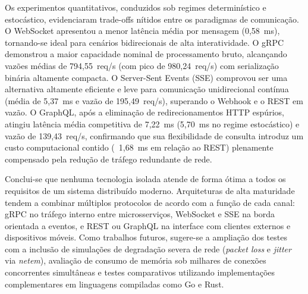 \documentclass[a4paper,12pt]{article}
\begin{document}
Os experimentos quantitativos, conduzidos sob regimes determinístico e estocástico, evidenciaram trade-offs nítidos entre os paradigmas de comunicação. O WebSocket apresentou a menor latência média por mensagem (0,58~ms), tornando-se ideal para cenários bidirecionais de alta interatividade. O gRPC demonstrou a maior capacidade nominal de processamento bruto, alcançando vazões médias de 794,55~req/s (com pico de 980,24~req/s) com serialização binária altamente compacta. O Server-Sent Events (SSE) comprovou ser uma alternativa altamente eficiente e leve para comunicação unidirecional contínua (média de 5,37~ms e vazão de 195,49~req/s), superando o Webhook e o REST em vazão. O GraphQL, após a eliminação de redirecionamentos HTTP espúrios, atingiu latência média competitiva de 7,22~ms (5,70~ms no regime estocástico) e vazão de 139,43~req/s, confirmando que sua flexibilidade de consulta introduz um custo computacional contido (~1,68~ms em relação ao REST) plenamente compensado pela redução de tráfego redundante de rede.

Conclui-se que nenhuma tecnologia isolada atende de forma ótima a todos os requisitos de um sistema distribuído moderno. Arquiteturas de alta maturidade tendem a combinar múltiplos protocolos de acordo com a função de cada canal: gRPC no tráfego interno entre microsserviços, WebSocket e SSE na borda orientada a eventos, e REST ou GraphQL na interface com clientes externos e dispositivos móveis. Como trabalhos futuros, sugere-se a ampliação dos testes com a inclusão de simulações de degradação severa de rede (\textit{packet loss} e \textit{jitter} via \textit{netem}), avaliação de consumo de memória sob milhares de conexões concorrentes simultâneas e testes comparativos utilizando implementações complementares em linguagens compiladas como Go e Rust.


\newpage


\end{document}
